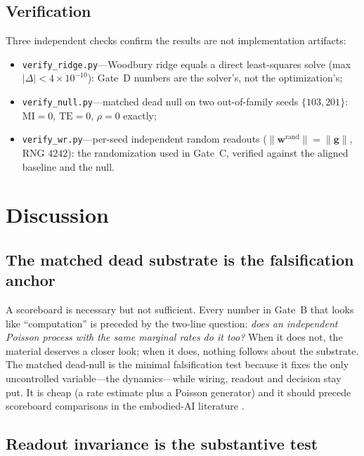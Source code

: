 \documentclass[10pt,a4paper]{article}
\newcommand{\MI}{\ensuremath{\mathrm{MI}}}
\newcommand{\TE}{\ensuremath{\mathrm{TE}}}
\begin{document}
\subsection{Verification}\label{sec:verify}
Three independent checks confirm the results are not implementation
artifacts:
\begin{itemize}[nosep]
\item \texttt{verify\_ridge.py}---Woodbury ridge equals a direct
least-squares solve (max $|\Delta|<4\times10^{-10}$): Gate~D numbers
are the solver's, not the optimization's;
\item \texttt{verify\_null.py}---matched dead null on two out-of-family
seeds $\{103,201\}$: $\MI=0$, $\TE=0$, $\rho=0$ exactly;
\item \texttt{verify\_wr.py}---per-seed independent random readouts
($\|\mathbf{w}^{\mathrm{rand}}\|=\|\mathbf{g}\|$, RNG $4242$): the
randomization used in Gate~C, verified against the aligned baseline
and the null.
\end{itemize}

\section{Discussion}\label{sec:discussion}

\subsection{The matched dead substrate is the falsification
anchor}\label{sec:disc1}

A scoreboard is necessary but not sufficient. Every number in
Gate~B that looks like ``computation'' is preceded by the two-line
question: \emph{does an independent Poisson process with the same
marginal rates do it too?} When it does not, the material deserves a
closer look; when it does, nothing follows about the substrate. The
matched dead-null is the minimal falsification test because it fixes
the only uncontrolled variable---the dynamics---while wiring, readout
and decision stay put. It is cheap (a rate estimate plus a Poisson
generator) and it should precede scoreboard comparisons in the
embodied-AI literature \cite{kagan2022dishbrain,balci2023neurons,
lukosevicius2009}.

\subsection{Readout invariance is the substantive test}\label{sec:disc2}
\end{document}
